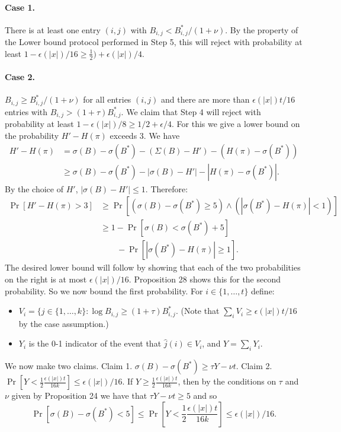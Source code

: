\paragraph{Case 1.} There is at least one entry $(i,j)$ with $B_{i,j}<B^*_{i,j}/(1+\nu)$. By the property of the Lower bound protocol performed in Step 5, this will reject with probability at least $1-\epsilon(|x|)/16\ge\frac12)+\epsilon(|x|)/4$.
\paragraph{Case 2.} $B_{i,j}\ge B^*_{i,j}/(1+\nu)$ for all entries $(i,j)$ and there are more than $\epsilon(|x|)t/16$ entries with $B_{i,j}>(1+\tau)B^*_{i,j}$. We claim that Step 4 will reject with probability at least $1-\epsilon(|x|)/8\ge1/2+\epsilon/4$. For this we give a lower bound on the probability $H'-H(\pi)$ exceeds 3. We have
\begin{align*}H'-H(\pi)&=\sigma(B)-\sigma(B^*)-(\Sigma(B)-H')-(H(\pi)-\sigma(B^*))\\
&\ge\sigma(B)-\sigma(B^*)-|\sigma(B)-H'|-|H(\pi)-\sigma(B^*)|.\end{align*}
By the choice of $H'$, $|\sigma(B)-H'|\le1$. Therefore:
\begin{align*}\Pr[H'-H(\pi)>3]&\ge\Pr[(\sigma(B)-\sigma(B^*)\ge5)\land(|\sigma(B^*)-H(\pi)|<1)]\\
&\ge1-\Pr[\sigma(B)<\sigma(B^*)+5]\\&\qquad-\Pr[|\sigma(B^*)-H(\pi)|\ge1].\end{align*}
The desired lower bound will follow by showing that each of the two probabilities on the right is at most $\epsilon(|x|)/16$. Proposition 28 shows this for the second probability. So we now bound the first probability. For $i\in\{1,\ldots,t\}$ define:
\begin{itemize}\item $V_i=\{j\in\{1,\ldots,k\}:\log B_{i,j}\ge(1+\tau)B^*_{i,j}$. (Note that $\sum_i V_i\ge\epsilon(|x|)t/16$ by the case assumption.)
\item $Y_i$ is the 0-1 indicator of the event that $\hat j(i)\in V_i$, and $Y=\sum_iY_i$.\end{itemize}
We now make two claims. Claim 1. $\sigma(B)-\sigma(B^*)\ge\tau Y-\nu t$. Claim 2. $\Pr[Y<\frac12\frac{\epsilon(|x|)t}{16k}]\le\epsilon(|x|)/16$.
If $Y\ge\frac12\frac{\epsilon(|x|)t}{16k}$, then by the conditions on $\tau$ and $\nu$ given by Proposition 24 we have that $\tau Y-\nu t\ge5$ and so
\[\Pr[\sigma(B)-\sigma(B^*)<5]\le\Pr\left[Y<\frac12\frac{\epsilon(|x|)t}{16k}\right]\le\epsilon(|x|)/16.\]
